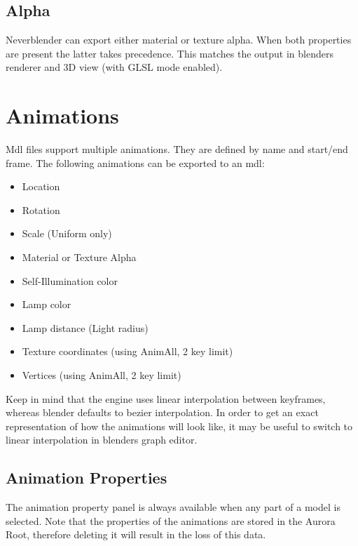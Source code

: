\subsection*{Alpha}
Neverblender can export either material or texture alpha. When both properties are present 
the latter takes precedence. This matches the output in blenders renderer 
and 3D view (with GLSL mode enabled).

\section{Animations}
Mdl files support multiple animations. They are defined by name and start/end frame.
The following animations can be exported to an mdl:
\begin{itemize}
    \item Location
    \item Rotation
    \item Scale (Uniform only)
    \item Material or Texture Alpha
    \item Self-Illumination color
    \item Lamp color
    \item Lamp distance (Light radius)
    \item Texture coordinates (using AnimAll, 2 key limit)
    \item Vertices (using AnimAll, 2 key limit)
\end{itemize}
Keep in mind that the engine uses linear interpolation between keyframes, whereas blender 
defaults to bezier interpolation. In order to get an exact representation of how the animations will 
look like, it may be useful to switch to linear interpolation in blenders graph editor.

\subsection{Animation Properties}


\begin{minipage}[t]{0.65\textwidth}
    The animation property panel is always available when any part of a model is selected. Note 
    that the properties of the animations are stored in the Aurora Root, therefore deleting it 
    will result in the loss of this data.
\end{minipage}\hfill
\begin{minipage}[t]{0.3\textwidth}
    \centering{}
    \label{fig1}
\end{minipage}

